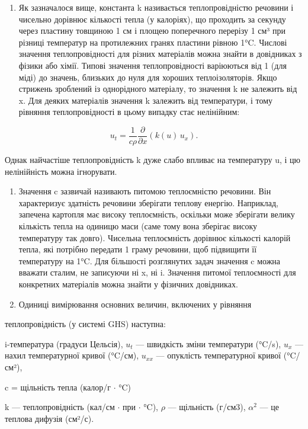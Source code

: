 \begin{enumerate}
\def\labelenumi{\arabic{enumi}.}
\tightlist
\item
  Як зазначалося вище, константа k називається теплопровідністю речовини і чисельно дорівнює кількості тепла (у калоріях), що проходить за секунду через пластину товщиною 1 см і площею поперечного перерізу 1 см³ при різниці температур на протилежних гранях пластини рівною 1°C. Числові значення теплопровідності для різних матеріалів можна знайти в довідниках з фізики або хімії. Типові значення теплопровідності варіюються від 1 (для міді) до значень, близьких до нуля для хороших теплоізоляторів. Якщо стрижень зроблений із однорідного матеріалу, то значення k не залежить від x. Для деяких матеріалів значення k залежить від температури, і тому рівняння теплопровідності в цьому випадку стає нелінійним:
\end{enumerate}

\[u_{t} = \frac{1}{c\rho} \frac{\partial}{\partial x}\left(k(u)\,u_{x}\right).\]

Однак найчастіше теплопровідність k дуже слабо впливає на температуру u, і цю нелінійність можна ігнорувати.

\begin{enumerate}
\def\labelenumi{\arabic{enumi}.}
\setcounter{enumi}{1}
\item
  Значення c зазвичай називають питомою теплоємністю речовини. Він характеризує здатність речовини зберігати теплову енергію. Наприклад, запечена картопля має високу теплоємність, оскільки може зберігати велику кількість тепла на одиницю маси (саме тому вона зберігає високу температуру так довго). Чисельна теплоємність дорівнює кількості калорій тепла, які потрібно передати 1 граму речовини, щоб підвищити її температуру на 1°C. Для більшості розглянутих задач значення c можна вважати сталим, не записуючи ні x, ні i. Значення питомої теплоємності для конкретних матеріалів можна знайти у фізичних довідниках.
\item
  Одиниці вимірювання основних величин, включених у рівняння
\end{enumerate}

теплопровідність (у системі GHS) наступна:

i-температура (градуси Цельсія), \(u_t\) --- швидкість зміни температури (°C/s), \(u_x\) --- нахил температурної кривої (°C/см), \(u_{xx}\) --- опуклість температурної кривої (°C/см²),

c = щільність тепла (калор/г \(\cdot\) °C)

k --- теплопровідність (кал/см \(\cdot\) при \(\cdot\) °C), \(\rho\) --- щільність (г/см3), \(\alpha^2\) --- це теплова дифузія (см²/с).

